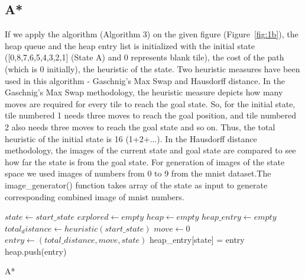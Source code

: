 \documentclass{svproc}
\begin{document}
\subsection{A*}
If we apply the algorithm (Algorithm 3)  on the given figure (Figure~\ref{fig:1b}), the heap queue and the heap entry list is initialized with the initial state ([0,8,7,6,5,4,3,2,1] (State A) and 0 represents blank tile), the cost of the path (which is 0 initially), the heuristic of the state. Two heuristic measures have been used in this algorithm - Gaschnig’s Max Swap and Hausdorff distance. In the Gaschnig’s Max Swap methodology, the heuristic measure depicts how many moves are required for every tile to reach the goal state. So, for the initial state, tile numbered 1 needs three moves to reach the goal position, and tile numbered 2 also needs three moves to reach the goal state and so on. Thus, the total heuristic of the initial state is 16 (1+2+...). In the Hausdorff distance methodology, the images of the current state and goal state are compared to see how far the state is from the goal state. For generation of images of the state space we used images of numbers from 0 to 9 from the mnist  dataset.The image\_generator() function takes array of the state as input to generate corresponding combined image of mnist numbers.

\begin{algorithm}[H]
	\SetAlgoLined
	$state \gets start\_state$\;
	$explored \gets empty$\;
	$heap \gets empty$\;
	$heap\_entry \gets empty$\;
	$total_distance \gets heuristic(start\_state)$\;
	$move \gets 0$\;
	$entry \gets (total\_distance, move, state)$\;
	heap\_entry[state] = entry\;
	heap.push(entry)\;
	\caption{A*}
\end{algorithm}
\end{document}
